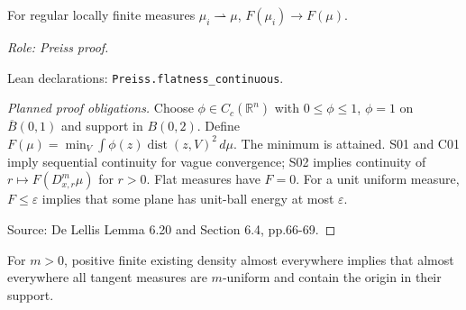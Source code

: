 \begin{lemma}
\label{lem:flatness-continuous}




For regular locally finite measures $\mu_i\rightharpoonup\mu$, $F(\mu_i)\to F(\mu)$.
\par\emph{Role: Preiss proof.}
\par Lean declarations: \texttt{Preiss.flatness\_continuous}.
\end{lemma}
\begin{proof}[Planned proof obligations]

Choose $\phi\in C_c(\mathbb R^n)$ with $0\leq\phi\leq1$,
$\phi=1$ on $\overline B(0,1)$ and support in $B(0,2)$.
Define $F(\mu)=\min_V\int\phi(z)\operatorname{dist}(z,V)^2\,d\mu$.
The minimum is attained. S01 and C01 imply sequential continuity for vague
convergence; S02 implies continuity of $r\mapsto F(D^m_{x,r}\mu)$ for $r>0$.
Flat measures have $F=0$. For a unit uniform measure, $F\leq\varepsilon$
implies that some plane has unit-ball energy at most $\varepsilon$.
\par Source: De Lellis Lemma 6.20 and Section 6.4, pp.66-69.
\end{proof}

\begin{lemma}
\label{lem:uniform-adapter}








For $m>0$, positive finite existing density almost everywhere implies that almost everywhere all tangent measures are $m$-uniform and contain the origin in their support.
\end{lemma}

